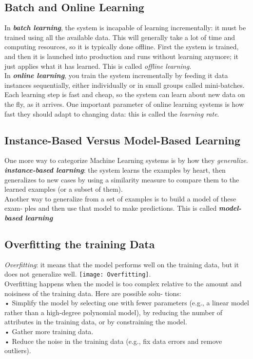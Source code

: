 \subsection*{Batch and Online Learning}
In \textbf{\textit{batch learning}}, the system is incapable of learning incrementally: it must be trained
using all the available data. This will generally take a lot of time and computing
resources, so it is typically done offline. First the system is trained, and then it is
launched into production and runs without learning anymore; it just applies what it
has learned. This is called \textit{offline learning}.\\

In \textbf{\textit{online learning}}, you train the system incrementally by feeding it data instances
sequentially, either individually or in small groups called mini-batches. Each learning
step is fast and cheap, so the system can learn about new data on the fly, as it arrives.
One important parameter of online learning systems is how fast they should adapt to
changing data: this is called the \textit{learning rate}.\\

\subsection*{Instance-Based Versus Model-Based Learning}
One more way to categorize Machine Learning systems is by how they \textit{generalize}.
\textbf{\textit{instance-based learning}}: the system learns the examples by heart, then
generalizes to new cases by using a similarity measure to compare them to the
learned examples (or a subset of them).\\
Another way to generalize from a set of examples is to build a model of these exam‐
ples and then use that model to make predictions. This is called \textbf{\textit{model-based learning}}\\

\subsection*{Overfitting the training Data}
\textit{Overfitting}:  it means that the model performs well on the training data, but it does not generalize
well. \texttt{[image: Overfitting]}.\\
Overfitting happens when the model is too complex relative to the
amount and noisiness of the training data. Here are possible solu‐
tions:\\
• Simplify the model by selecting one with fewer parameters
(e.g., a linear model rather than a high-degree polynomial
model), by reducing the number of attributes in the training
data, or by constraining the model.\\
• Gather more training data.\\
• Reduce the noise in the training data (e.g., fix data errors and
remove outliers).\\

